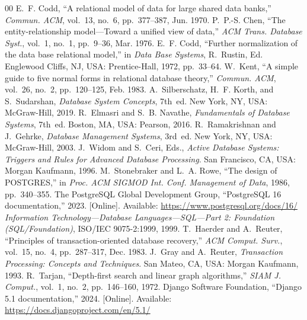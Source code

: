 \documentclass[conference]{IEEEtran}
\begin{document}
\begin{thebibliography}{00}
 E.~F. Codd, ``A relational model of data for large shared data banks,'' \textit{Commun. ACM}, vol.~13, no.~6, pp.~377--387, Jun. 1970.
 P.~P.-S. Chen, ``The entity-relationship model---Toward a unified view of data,'' \textit{ACM Trans. Database Syst.}, vol.~1, no.~1, pp.~9--36, Mar. 1976.
 E.~F. Codd, ``Further normalization of the data base relational model,'' in \textit{Data Base Systems}, R.~Rustin, Ed. Englewood Cliffs, NJ, USA: Prentice-Hall, 1972, pp.~33--64.
 W.~Kent, ``A simple guide to five normal forms in relational database theory,'' \textit{Commun. ACM}, vol.~26, no.~2, pp.~120--125, Feb. 1983.
 A.~Silberschatz, H.~F. Korth, and S.~Sudarshan, \textit{Database System Concepts}, 7th~ed. New York, NY, USA: McGraw-Hill, 2019.
 R.~Elmasri and S.~B. Navathe, \textit{Fundamentals of Database Systems}, 7th~ed. Boston, MA, USA: Pearson, 2016.
 R.~Ramakrishnan and J.~Gehrke, \textit{Database Management Systems}, 3rd~ed. New York, NY, USA: McGraw-Hill, 2003.
 J.~Widom and S.~Ceri, Eds., \textit{Active Database Systems: Triggers and Rules for Advanced Database Processing}. San Francisco, CA, USA: Morgan Kaufmann, 1996.
 M.~Stonebraker and L.~A. Rowe, ``The design of POSTGRES,'' in \textit{Proc. ACM SIGMOD Int. Conf. Management of Data}, 1986, pp.~340--355.
 The PostgreSQL Global Development Group, ``PostgreSQL 16 documentation,'' 2023. [Online]. Available: \url{https://www.postgresql.org/docs/16/}
 \textit{Information Technology---Database Languages---SQL---Part 2: Foundation (SQL/Foundation)}, ISO/IEC 9075-2:1999, 1999.
 T.~Haerder and A.~Reuter, ``Principles of transaction-oriented database recovery,'' \textit{ACM Comput. Surv.}, vol.~15, no.~4, pp.~287--317, Dec. 1983.
 J.~Gray and A.~Reuter, \textit{Transaction Processing: Concepts and Techniques}. San Mateo, CA, USA: Morgan Kaufmann, 1993.
 R.~Tarjan, ``Depth-first search and linear graph algorithms,'' \textit{SIAM J. Comput.}, vol.~1, no.~2, pp.~146--160, 1972.
 Django Software Foundation, ``Django 5.1 documentation,'' 2024. [Online]. Available: \url{https://docs.djangoproject.com/en/5.1/}
\end{thebibliography}
\end{document}
